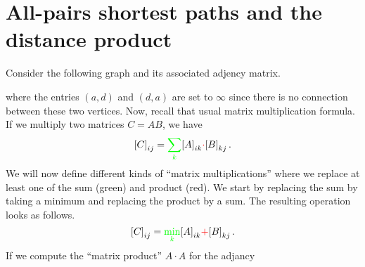 \section{All-pairs shortest paths and the distance product}
Consider the following graph and its associated adjency matrix.
\begin{figure}[h!]
  \centering
\end{figure}
where the entries $(a,d)$ and $(d,a)$ are set to $\infty$ since there
is no connection between these two vertices. Now, recall that usual
matrix multiplication formula. If we multiply two matrices $C = AB$,
we have
\begin{equation*}
  {[C]}_{ij} = {\color{green}\sum_k} {[A]}_{ik} {\color{red}\cdot} {[B]}_{kj}\,.
\end{equation*}
We will now define different kinds of ``matrix multiplications'' where
we replace at least one of the sum (green) and product (red). We start
by replacing the sum by taking a minimum and replacing the product by
a sum. The resulting operation looks as follows.
\begin{equation*}
  {[C]}_{ij} = {\color{green}\min_k} {[A]}_{ik} {\color{red}+} {[B]}_{kj}\,.
\end{equation*}
If we compute the ``matrix product'' $A \cdot A$ for the adjancy
